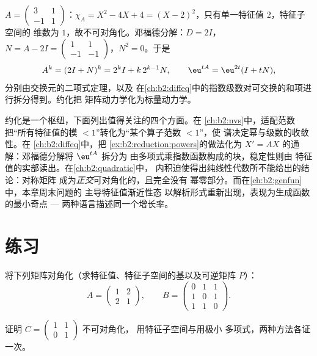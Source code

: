 \begin{example}[幂与指数]\label{ex:b2:reduction:powers}
$A = \begin{pmatrix} 3 & 1\\ -1 & 1\end{pmatrix}$：$\chi_A = X^2 -
4X + 4 = (X-2)^2$，只有单一特征值 $2$，特征子空间的
维数为 $1$，故不可对角化。邓福德分解：$D = 2I$，$N = A - 2I =
\begin{pmatrix} 1 & 1\\ -1 & -1\end{pmatrix}$，$N^2 = 0$。于是
\[
A^k = (2I + N)^k = 2^k I + k\,2^{k-1} N ,
\qquad
\eu^{tA} = \eu^{2t}(I + tN),
\]
分别由交换元的二项式定理，以及
在\cref{ch:b2:diffeq}中的指数级数对可交换的和项进行拆分得到。约化把
矩阵动力学化为标量动力学。
\end{example}

\begin{remark}[本卷中的几个视角]\label{rem:b2:reduction:perspectives}
约化是一个枢纽，下面列出值得关注的四个方面。在
\cref{ch:b2:nvs}中，适配范数把“所有特征值的模
$< 1$”转化为“某个算子范数 $< 1$”，使
谱决定幂与级数的收敛性。在
\cref{ch:b2:diffeq}中，把
\cref{ex:b2:reduction:powers}的做法化为
$X' = AX$ 的通解：邓福德分解将 $\eu^{tA}$ 拆分为
由多项式乘指数函数构成的块，稳定性则由
特征值的实部读出。在\cref{ch:b2:quadratic}中，
内积迫使得出纯线性代数所不能给出的结论：对称矩阵
成为\emph{正交}可对角化的，且完全没有
幂零部分。而在\cref{ch:b2:genfun}中，本章周末问题的
主导特征值渐近性态
以解析形式重新出现，表现为生成函数的最小奇点 ---
两种语言描述同一个增长率。
\end{remark}

\section{练习}

\begin{exercise}[$\star$]\label{exo:b2:reduction:1}
将下列矩阵对角化（求特征值、特征子空间的基以及可逆矩阵 $P$）：
\[
A = \begin{pmatrix} 1 & 2\\ 2 & 1 \end{pmatrix},
\qquad
B = \begin{pmatrix} 0 & 1 & 1\\ 1 & 0 & 1\\ 1 & 1 & 0
\end{pmatrix}.
\]
\end{exercise}

\begin{exercise}[$\star$]\label{exo:b2:reduction:2}
证明 $C = \begin{pmatrix} 1 & 1\\ 0 & 1\end{pmatrix}$ 不可对角化，
用特征子空间与用极小
多项式，两种方法各证一次。
\end{exercise}

